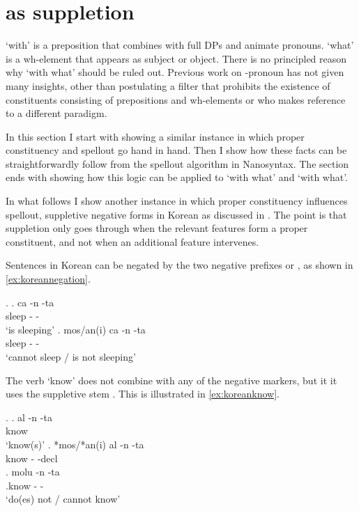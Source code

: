 \documentclass{article}
\begin{document}
\section{ as suppletion}

 `with' is a preposition that combines with full DPs and animate pronouns.  `what' is a wh-element that appears as subject or object. There is no principled reason why  `with what' should be ruled out. Previous work on -pronoun has not given many insights, other than \citet{riemsdijk1978} postulating a filter that prohibits the existence of constituents consisting of prepositions and wh-elements or \citet{koopman2000} who makes reference to a different paradigm.

In this section I start with showing a similar instance in which proper constituency and spellout go hand in hand. Then I show how these facts can be straightforwardly follow from the spellout algorithm in Nanosyntax. The section ends with showing how this logic can be applied to  `with what' and  `with what'.

In what follows I show another instance in which proper constituency influences spellout, suppletive negative forms in Korean as discussed in \citet{chung2007}. The point is that suppletion only goes through when the relevant features form a proper constituent, and not when an additional feature intervenes.

Sentences in Korean can be negated by the two negative prefixes  or , as shown in \ref{ex:koreannegation}.

\ex.\label{ex:koreannegation}
\ag. ca -n -ta\\
 sleep - -\\
 `is sleeping'
\bg. mos/an(i) ca -n -ta\\
  sleep - -\\
 `cannot sleep / is not sleeping' \hfill \citep{chung2007}

The verb  `know' does not combine with any of the negative markers, but it it uses the suppletive stem . This is illustrated in \ref{ex:koreanknow}.

\ex.\label{ex:koreanknow}
\ag. al -n -ta\\
know  \\
`know(s)'
\bg. *mos/*an(i) al -n -ta\\
 know - -decl\tsc{}\\
\bg. molu -n -ta\\
.know - -\\
`do(es) not / cannot know'\label{ex:molu} \hfill \citep{chung2007}
\end{document}
